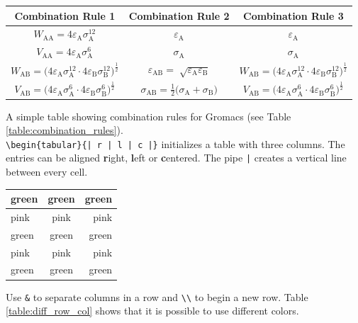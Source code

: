 \documentclass[a4paper, 11pt]{scrreprt}
\begin{document}
\begin{center}
\label{table:combination_rules} %
\begin{tabular}{| c | c | c |}
\textbf{Combination Rule 1} & \textbf{Combination Rule 2} & \textbf{Combination Rule 3} \\
\hline
$W_\mathrm{AA} = 4\varepsilon_\mathrm{A}\sigma^{12}_\mathrm{A}$ & $\varepsilon_\mathrm{A}$ & $\varepsilon_\mathrm{A}$ \\
$V_\mathrm{AA} = 4\varepsilon_\mathrm{A}\sigma^{6}_\mathrm{A}$ & $\sigma_\mathrm{A}$ & $\sigma_\mathrm{A}$ \\
\hline
$W_\mathrm{AB} = \Big( 4\varepsilon_\mathrm{A}\sigma^{12}_\mathrm{A} \cdot 4\varepsilon_\mathrm{B}\sigma^{12}_\mathrm{B} \Big)^{\frac{1}{2}}$ & $\varepsilon_\mathrm{AB} = \sqrt[]{\varepsilon_\mathrm{A}\varepsilon_\mathrm{B}}$ & $W_\mathrm{AB} = \Big( 4\varepsilon_\mathrm{A}\sigma^{12}_\mathrm{A} \cdot 4\varepsilon_\mathrm{B}\sigma^{12}_\mathrm{B} \Big)^{\frac{1}{2}}$ \\
$V_\mathrm{AB} = \Big( 4\varepsilon_\mathrm{A}\sigma^{6}_\mathrm{A} \cdot 4\varepsilon_\mathrm{B}\sigma^{6}_\mathrm{B} \Big)^{\frac{1}{2}}$ & $\sigma_\mathrm{AB} = \frac{1}{2}\big(\sigma_\mathrm{A} + \sigma_\mathrm{B} \big)$ & $V_\mathrm{AB} = \Big( 4\varepsilon_\mathrm{A}\sigma^{6}_\mathrm{A} \cdot 4\varepsilon_\mathrm{B}\sigma^{6}_\mathrm{B} \Big)^{\frac{1}{2}}$ \\
\end{tabular}
\end{center}
\noindent
A simple table showing combination rules for Gromacs (see Table \ref{table:combination_rules}).\\
\verb+\begin{tabular}{| r | l | c |}+ initializes a table with three columns. The entries can be aligned \textbf{r}ight, \textbf{l}eft or \textbf{c}entered. The pipe \verb+|+ creates a vertical line between every cell.\\
\newline

\begin{center}
\label{table:diff_row_col}
\begin{tabular}{l | c | r}
green & green & green \\
\hline
pink & pink & pink \\
green & green & green \\
pink & pink & pink \\
green & green & green \\
\end{tabular}
\end{center}
\noindent
Use \verb+&+ to separate columns in a row and \verb+\\+ to begin a new row. Table \ref{table:diff_row_col} shows that it is possible to use different colors.
\end{document}
